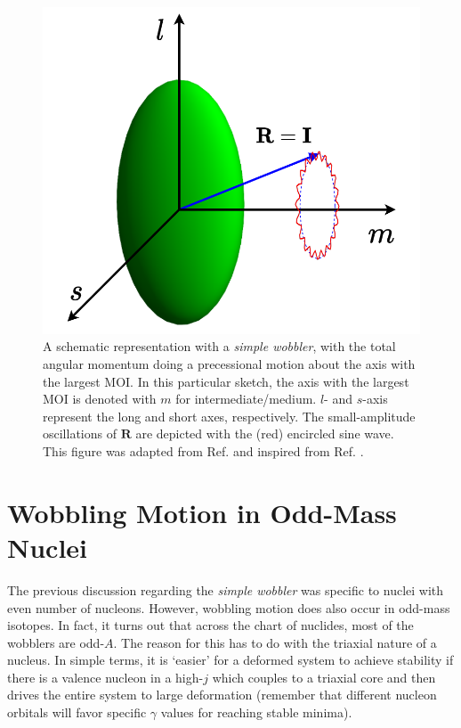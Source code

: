 \begin{figure}
    \centering
    \includegraphics[scale=0.6]{Chapters/Figures/simple-wobbler.pdf}
    \caption{A schematic representation with a \emph{simple wobbler}, with the total angular momentum doing a precessional motion about the axis with the largest MOI. In this particular sketch, the axis with the largest MOI is denoted with $m$ for intermediate/medium. $l$- and $s$-axis represent the long and short axes, respectively. The small-amplitude oscillations of $\mathbf{R}$ are depicted with the (red) encircled sine wave. This figure was adapted from Ref. \cite{poenaru2021extensive} and inspired from Ref. \cite{sensharma2020longitudinal}.}
    \label{simple-wobbler-geometrical-schematic}
\end{figure}

\section{Wobbling Motion in Odd-Mass Nuclei}

The previous discussion regarding the \emph{simple wobbler} was specific to nuclei with even number of nucleons. However, wobbling motion does also occur in odd-mass isotopes. In fact, it turns out that across the chart of nuclides, most of the wobblers are odd-$A$. The reason for this has to do with the triaxial nature of a nucleus. In simple terms, it is `easier' for a deformed system to achieve stability if there is a valence nucleon in a high-$j$ which couples to a triaxial core and then drives the entire system to large deformation (remember that different nucleon orbitals will favor specific $\gamma$ values for reaching stable minima).

